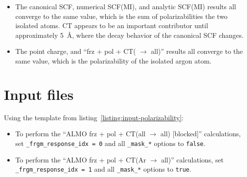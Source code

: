 \begin{itemize}
\item The canonical SCF, numerical SCF(MI), and analytic SCF(MI) results all converge to the same value, which is the sum of polarizabilities the two isolated atoms. CT appears to be an important contributor until approximately \SI{5}{\angstrom}, where the decay behavior of the canonical SCF changes.
\item The point charge, and ``frz + pol + CT( \(\rightarrow\) all)'' results all converge to the same value, which is the polarizability of the isolated argon atom.
\end{itemize}

\section{Input files}



Using the template from listing~\ref{listing:input-polarizability}:

\begin{itemize}
\item To perform the ``ALMO frz + pol + CT(all \(\rightarrow\) all) [blocked]'' calculations, set \lstinline|_frgm_response_idx = 0| and all \lstinline|_mask_*| options to \lstinline|false|.
\item To perform the ``ALMO frz + pol + CT(Ar \(\rightarrow\) all)'' calculations, set \lstinline|_frgm_response_idx = 1| and all \lstinline|_mask_*| options to \lstinline|true|.
\end{itemize}

